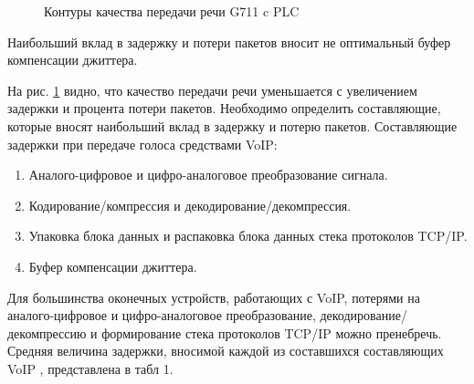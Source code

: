 \pgfplotsset{width=15cm, height=10cm, compat=1.3}
\begin{figure} [h]
  \center
{}
\caption{Контуры качества передачи речи G711 c PLC}
  \label{img1:qos_dd}
\end{figure}



Наибольший вклад в задержку и потери пакетов вносит не оптимальный буфер компенсации джиттера. 

На рис. \ref{img1:qos_dd} видно, что качество передачи
речи уменьшается с увеличением задержки и
процента потери пакетов. Необходимо определить составляющие, которые вносят
наибольший вклад в задержку и потерю пакетов.
Составляющие задержки при передаче голоса средствами VoIP:
\begin{enumerate}
 \item Аналого-цифровое и цифро-аналоговое преобразование сигнала.
 \item Кодирование/компрессия и декодирование/декомпрессия.
 \item Упаковка блока данных и распаковка блока данных стека протоколов TCP/IP.
 \item Буфер компенсации джиттера.
\end{enumerate}

Для большинства оконечных устройств, работающих с VoIP, потерями на аналого-цифровое и цифро-аналоговое преобразование, 
декодирование/декомпрессию и формирование стека протоколов TCP/IP можно пренебречь. 
Средняя величина задержки, вносимой каждой из составшихся составляющих VoIP \cite{G114,Y1541}, представлена в табл 1.


